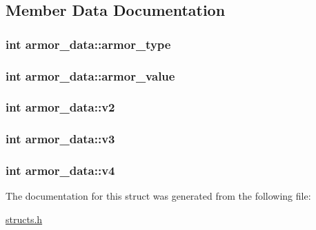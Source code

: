 \subsection{Member Data Documentation}
\hypertarget{structarmor__data_a8199d5bf7879ab9d0fbdd84817bbc003}{
\subsubsection[{armor\-\_\-type}]{\setlength{\rightskip}{0pt plus 5cm}int armor\-\_\-data\-::armor\-\_\-type}}\label{structarmor__data_a8199d5bf7879ab9d0fbdd84817bbc003}
\hypertarget{structarmor__data_a3c588b41bef925fa09984bf7ff6488e8}{
\subsubsection[{armor\-\_\-value}]{\setlength{\rightskip}{0pt plus 5cm}int armor\-\_\-data\-::armor\-\_\-value}}\label{structarmor__data_a3c588b41bef925fa09984bf7ff6488e8}
\hypertarget{structarmor__data_ad2ca09ad88f7b998e693fc751f3f8afd}{
\subsubsection[{v2}]{\setlength{\rightskip}{0pt plus 5cm}int armor\-\_\-data\-::v2}}\label{structarmor__data_ad2ca09ad88f7b998e693fc751f3f8afd}
\hypertarget{structarmor__data_ad1209b7520bc204359a631758d0abb00}{
\subsubsection[{v3}]{\setlength{\rightskip}{0pt plus 5cm}int armor\-\_\-data\-::v3}}\label{structarmor__data_ad1209b7520bc204359a631758d0abb00}
\hypertarget{structarmor__data_a529fce0de171698bdc500a325628ec79}{
\subsubsection[{v4}]{\setlength{\rightskip}{0pt plus 5cm}int armor\-\_\-data\-::v4}}\label{structarmor__data_a529fce0de171698bdc500a325628ec79}


The documentation for this struct was generated from the following file\-:\begin{DoxyCompactItemize}
\item 
\hyperlink{structs_8h}{structs.\-h}\end{DoxyCompactItemize}
